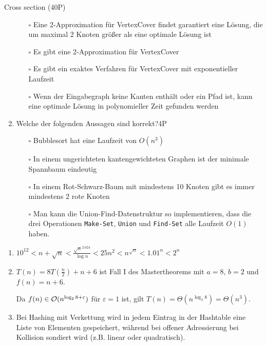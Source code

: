\documentclass{article}
\begin{document}
\begin{exercise}{Cross section (40P)}
\begin{enumerate}
          \begin{itemize}
            \item[$\square$] Eine 2-Approximation für VertexCover findet garantiert eine Lösung, die um maximal 2 Knoten größer als eine optimale Lösung ist
            \item[$\square$] Es gibt eine 2-Approximation für VertexCover
            \item[$\square$] Es gibt ein exaktes Verfahren für VertexCover mit exponentieller Laufzeit
            \item[$\square$] Wenn der Eingabegraph keine Kanten enthält oder ein Pfad ist, kann eine optimale Lösung in polynomieller Zeit gefunden werden
          \end{itemize}
    \item Welche der folgenden Aussagen sind korrekt?\hfill 4P
          \begin{itemize}
            \item[$\square$] Bubblesort hat eine Laufzeit von $O(n^3)$
            \item[$\square$] In einem ungerichteten kantengewichteten Graphen ist der minimale Spannbaum eindeutig
            \item[$\square$] In einem Rot-Schwarz-Baum mit mindestens 10 Knoten gibt es immer mindestens 2 rote Knoten
            \item[$\square$] Man kann die Union-Find-Datenstruktur so implementieren, dass die drei Operationen \texttt{Make-Set}, \texttt{Union} und \texttt{Find-Set} alle Laufzeit $O(1)$ haben.
          \end{itemize}
  \end{enumerate}
  \begin{solution}
    \begin{enumerate}
      \item $10^{12} < n + \sqrt{n} < \frac{\sqrt{n}^{2.024}}{\log n} < 25n^2 < n^{\sqrt{n}} < {1.01}^n < 2^n$
      \item $T(n) = 8T\left(\frac{n}{2}\right) + n +6$ ist Fall I des Mastertheorems mit $a = 8$, $b = 2$ und $f(n) = n + 6$.\par
            Da $f(n) \in \mathcal{O}(n^{\log_2 8 + \varepsilon})$ für $\varepsilon = 1$ ist, gilt $T(n) = \Theta(n^{\log_2 8}) = \Theta(n^3)$.
      \item Bei Hashing mit Verkettung wird in jedem Eintrag in der Hashtable eine Liste von Elementen gespeichert, während bei offener Adressierung bei Kollision sondiert wird (z.B. linear oder quadratisch).

\end{enumerate}
\end{solution}
\end{exercise}
\end{document}
